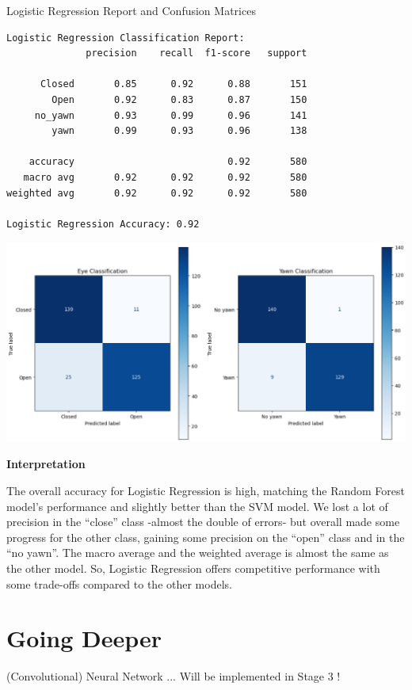 \documentclass{modeleRapport}
\begin{document}
\begin{codebox}[OutputE]{ Logistic Regression Report and Confusion Matrices}
\begin{verbatim}
Logistic Regression Classification Report:
              precision    recall  f1-score   support

      Closed       0.85      0.92      0.88       151
        Open       0.92      0.83      0.87       150
     no_yawn       0.93      0.99      0.96       141
        yawn       0.99      0.93      0.96       138

    accuracy                           0.92       580
   macro avg       0.92      0.92      0.92       580
weighted avg       0.92      0.92      0.92       580

Logistic Regression Accuracy: 0.92
\end{verbatim}

\includegraphics[width=15cm]{Images/LR_cm.png}

\end{codebox}

\textbf{Interpretation\\}

The overall accuracy for Logistic Regression is high, matching the Random Forest model's performance and slightly better than the SVM model. We lost a lot of precision in the “close” class -almost the double of errors- but overall made some progress for the other class, gaining some precision on the “open” class and in the “no yawn”. The macro average and the weighted average is almost the same as the other model.
So, Logistic Regression offers competitive performance with some trade-offs compared to the other models.

\newpage

\section{Going Deeper}

(Convolutional) Neural Network ... Will be implemented in Stage 3 !


\insererbiblio
\end{document}
